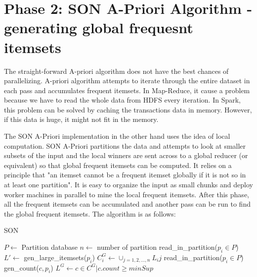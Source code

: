 \documentclass[11pt]{article}
\begin{document}
\section{Phase 2: SON A-Priori Algorithm - generating global frequesnt itemsets}
The straight-forward A-priori algorithm does not have the best chances of parallelizing.
A-priori algorithm attempts to iterate through the entire dataset in each pass and accumulates frequent itemsets.
In Map-Reduce, it cause a problem because we have to read the whole data from HDFS every iteration.
In Spark, this problem can be solved by caching the transactions data in memory.
However, if this data is huge, it might not fit in the memory.

The SON A-Priori implementation in the other hand uses the idea of local computation.
SON A-Priori partitions the data and attempts to look at smaller subsets of the input and the local winners are sent across to a global reducer (or equivalent) so that global frequent itemsets can be computed.
It relies on a principle that "an itemset cannot be a frequent itemset globally if it is not so in at least one partition".
It is easy to organize the input as small chunks and deploy worker machines in parallel to mine the local frequent itemsets.
After this phase, all the frequent itemsets can be accumulated and another pass can be run to find the global frequent itemsets.
The algorithm is as follows: \\

\begin{algorithm}[H]
    \caption{SON}

    \begin{algorithmic}[1]
        \State $P \gets $ Partition database
        \State $n \gets $ number of partition
        \State
         
            \State read\_in\_partition($p_i \in P$)
            \State $L' \gets$ gen\_large\_itemsets($p_i$)
        \EndFor
            \State $C_{i}^{G} \gets \cup_{j=1,2,...,n}L_{i}{j}$ 
        \EndFor
         
            \State read\_in\_partition($p_i \in P$)
                gen\_count($c, p_i$)
            \EndFor
        \EndFor
        \State $L^G \gets {c \in C^G|c.count \geq minSup}$
    \end{algorithmic}
\end{algorithm}
 
\end{document}
